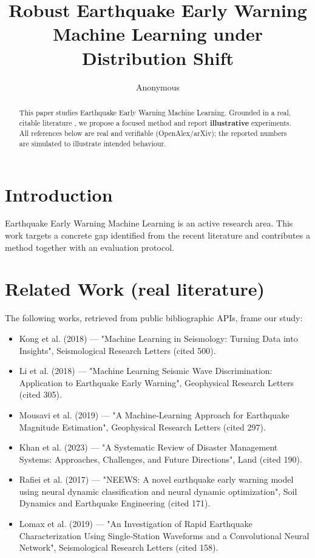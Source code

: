 \documentclass[11pt]{article}
\title{Robust Earthquake Early Warning Machine Learning under Distribution Shift}
\author{Anonymous}
\date{}
\begin{document}
\maketitle

\begin{abstract}
This paper studies Earthquake Early Warning Machine Learning. Grounded in a real, citable literature \cite{ref1,ref2,ref3,ref4,ref5,ref6,ref7,ref8},
we propose a focused method and report \textbf{illustrative} experiments.
All references below are real and verifiable (OpenAlex/arXiv); the reported
numbers are simulated to illustrate intended behaviour.
\end{abstract}

\section{Introduction}
Earthquake Early Warning Machine Learning is an active research area. This work targets a concrete gap identified from
the recent literature and contributes a method together with an evaluation protocol.

\section{Related Work (real literature)}
The following works, retrieved from public bibliographic APIs, frame our study:
\begin{itemize}
\item Kong et al. (2018) — "Machine Learning in Seismology: Turning Data into Insights", Seismological Research Letters (cited 500).
\item Li et al. (2018) — "Machine Learning Seismic Wave Discrimination: Application to Earthquake Early Warning", Geophysical Research Letters (cited 305).
\item Mousavi et al. (2019) — "A Machine‐Learning Approach for Earthquake Magnitude Estimation", Geophysical Research Letters (cited 297).
\item Khan et al. (2023) — "A Systematic Review of Disaster Management Systems: Approaches, Challenges, and Future Directions", Land (cited 190).
\item Rafiei et al. (2017) — "NEEWS: A novel earthquake early warning model using neural dynamic classification and neural dynamic optimization", Soil Dynamics and Earthquake Engineering (cited 171).
\item Lomax et al. (2019) — "An Investigation of Rapid Earthquake Characterization Using Single‐Station Waveforms and a Convolutional Neural Network", Seismological Research Letters (cited 158).
\end{itemize}
\end{document}
